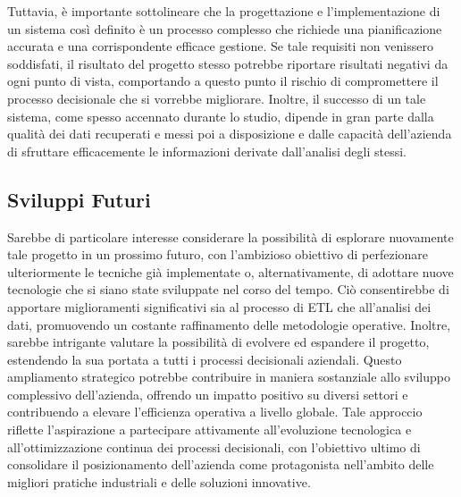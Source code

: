 Tuttavia, è importante sottolineare che la progettazione e l'implementazione di un sistema così definito è un processo complesso che richiede una pianificazione accurata e una corrispondente efficace gestione. Se tale requisiti non venissero soddisfati, il risultato del progetto stesso potrebbe riportare risultati negativi da ogni punto di vista, comportando a questo punto il rischio di compromettere il processo decisionale che si vorrebbe migliorare. Inoltre, il successo di un tale sistema, come spesso accennato durante lo studio, dipende in gran parte dalla qualità dei dati recuperati e messi poi a disposizione e dalle capacità dell'azienda di sfruttare efficacemente le informazioni derivate dall'analisi degli stessi.

\subsection{Sviluppi Futuri}

Sarebbe di particolare interesse considerare la possibilità di esplorare nuovamente tale progetto in un prossimo futuro, con l'ambizioso obiettivo di perfezionare ulteriormente le tecniche già implementate o, alternativamente, di adottare nuove tecnologie che si siano state sviluppate nel corso del tempo. Ciò consentirebbe di apportare miglioramenti significativi sia al processo di ETL che all'analisi dei dati, promuovendo un costante raffinamento delle metodologie operative. Inoltre, sarebbe intrigante valutare la possibilità di evolvere ed espandere il progetto, estendendo la sua portata a tutti i processi decisionali aziendali. Questo ampliamento strategico potrebbe contribuire in maniera sostanziale allo sviluppo complessivo dell'azienda, offrendo un impatto positivo su diversi settori e contribuendo a elevare l'efficienza operativa a livello globale. Tale approccio riflette l'aspirazione a partecipare attivamente all'evoluzione tecnologica e all'ottimizzazione continua dei processi decisionali, con l'obiettivo ultimo di consolidare il posizionamento dell'azienda come protagonista nell'ambito delle migliori pratiche industriali e delle soluzioni innovative.